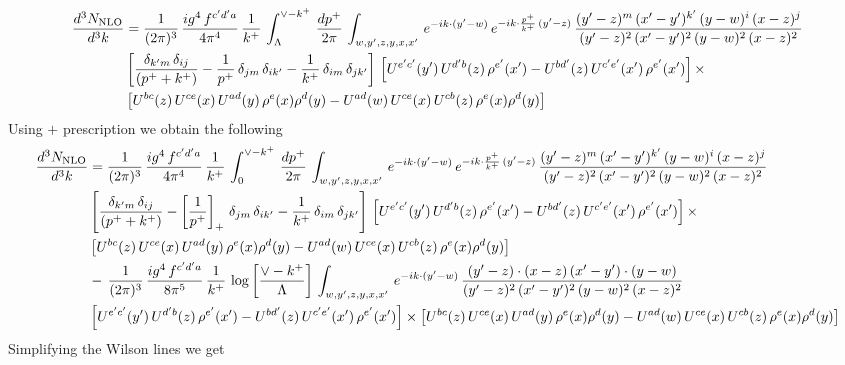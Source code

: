 \documentclass[9pt]{article}
\numberwithin{equation}{section}
\begin{document}
\begin{align}
     \frac{d^{3}N_{\rm NLO}}{d^{3}k} & = \frac{1}{(2\pi)^{3}}\, \frac{ig^{4}\,f^{c'd'a}}{4\pi^{4}}\, \frac{1}{k^{+}}\,\int_{\Lambda}^{\vee-k^{+}}\, \frac{dp^{+}}{2\pi}\, \int_{w,y',z,y,x,x'}\, e^{-ik\cdot (y'-w)}\, e^{-ik\cdot \frac{p^{+}}{k^{+}}\,(y'-z)}\,\frac{(y'-z)^{m}\,(x'-y')^{k'}\,(y-w)^{i}\,(x-z)^{j}}{(y'-z)^{2}\,(x'-y')^{2}\,(y-w)^{2}\,(x-z)^{2}}\notag \\ & \left[\frac{\delta_{k'm}\,\delta_{ij}}{(p^{+}+k^{+})}-\frac{1}{p^{+}}\,\delta_{jm}\,\delta_{ik'}-\frac{1}{k^{+}}\, \delta_{im}\, \delta_{jk'}\right]\, \left[U^{e'c'}(y')\,U^{d'b}(z)\,\rho^{e'}(x')-U^{bd'}(z)\,U^{c'e'}(x')\,\rho^{e'}(x')\right]\times\notag \\ &  \left[U^{bc}(z)\,U^{ce}(x)\,U^{ad}(y)\,\rho^{e}(x)\rho^{d}(y)-U^{ad}(w)\,U^{ce}(x)\,U^{cb}(z)\,\rho^{e}(x)\rho^{d}(y)\right]
\end{align}
Using $+$ prescription we obtain the following
\begin{align}
    \frac{d^{3}N_{\rm NLO}}{d^{3}k} & = \frac{1}{(2\pi)^{3}}\, \frac{ig^{4}\,f^{c'd'a}}{4\pi^{4}}\, \frac{1}{k^{+}}\,\int_{0}^{\vee-k^{+}}\, \frac{dp^{+}}{2\pi}\, \int_{w,y',z,y,x,x'}\, e^{-ik\cdot (y'-w)}\, e^{-ik\cdot \frac{p^{+}}{k^{+}}\,(y'-z)}\,\frac{(y'-z)^{m}\,(x'-y')^{k'}\,(y-w)^{i}\,(x-z)^{j}}{(y'-z)^{2}\,(x'-y')^{2}\,(y-w)^{2}\,(x-z)^{2}}\notag \\ & \left[\frac{\delta_{k'm}\,\delta_{ij}}{(p^{+}+k^{+})}-\left[\frac{1}{p^{+}}\right]_{+}\,\delta_{jm}\,\delta_{ik'}-\frac{1}{k^{+}}\, \delta_{im}\, \delta_{jk'}\right]\, \left[U^{e'c'}(y')\,U^{d'b}(z)\,\rho^{e'}(x')-U^{bd'}(z)\,U^{c'e'}(x')\,\rho^{e'}(x')\right]\times\notag \\ &  \left[U^{bc}(z)\,U^{ce}(x)\,U^{ad}(y)\,\rho^{e}(x)\rho^{d}(y)-U^{ad}(w)\,U^{ce}(x)\,U^{cb}(z)\,\rho^{e}(x)\rho^{d}(y)\right]\notag \\ & -\,\frac{1}{(2\pi)^{3}}\, \frac{ig^{4}\,f^{c'd'a}}{8\pi^{5}}\, \frac{1}{k^{+}}\,\log{\left[\frac{\vee - k^{+}}{\Lambda}\right]}\, \int_{w,y',z,y,x,x'}\, e^{-ik\cdot (y'-w)}\,\frac{(y'-z)\cdot (x-z)\,(x'-y')\cdot (y-w)}{(y'-z)^{2}\,(x'-y')^{2}\,(y-w)^{2}\,(x-z)^{2}}\notag \\ & \left[U^{e'c'}(y')\,U^{d'b}(z)\,\rho^{e'}(x')-U^{bd'}(z)\,U^{c'e'}(x')\,\rho^{e'}(x')\right]\times  \left[U^{bc}(z)\,U^{ce}(x)\,U^{ad}(y)\,\rho^{e}(x)\rho^{d}(y)-U^{ad}(w)\,U^{ce}(x)\,U^{cb}(z)\,\rho^{e}(x)\rho^{d}(y)\right]
\end{align}
Simplifying the Wilson lines we get 
\end{document}
